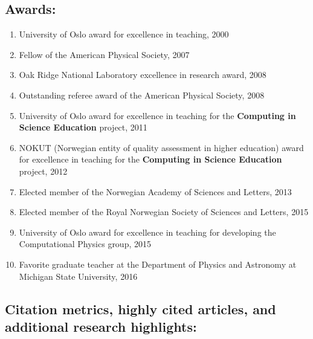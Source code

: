 \documentclass[%
oneside,                 %
final,                   %
10pt]{article}
\begin{document}
\subsection*{Awards:}

\begin{enumerate}
\item University of Oslo award for excellence in teaching, 2000

\item Fellow of the American Physical Society, 2007

\item Oak Ridge National Laboratory excellence in research award, 2008

\item Outstanding referee award of the American Physical Society, 2008

\item University of Oslo award for excellence in teaching for the \textbf{Computing in Science Education} project, 2011

\item NOKUT (Norwegian entity of quality assessment in higher education) award for excellence in teaching for the \textbf{Computing in Science Education} project, 2012

\item Elected member of the Norwegian Academy of Sciences and Letters, 2013

\item Elected member of the Royal Norwegian Society of Sciences and Letters, 2015 

\item University of Oslo award for excellence in teaching for developing the Computational Physics group, 2015

\item Favorite graduate teacher at the Department of Physics and Astronomy at Michigan State University, 2016 
\end{enumerate}

\noindent
\subsection*{Citation metrics, highly cited articles, and additional research highlights:}
\end{document}
